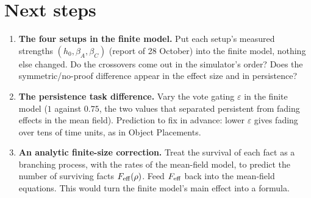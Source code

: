 \documentclass[10pt,a4paper]{article}
\begin{document}
\section{Next steps}
\begin{enumerate}
\item \textbf{The four setups in the finite model.} Put each setup's measured strengths $(h_0,\beta_A,\beta_C)$ (report
  of 28 October) into the finite model, nothing else changed. Do the crossovers come out in the simulator's order? Does
  the symmetric/no-proof difference appear in the effect size and in persistence?
\item \textbf{The persistence task difference.} Vary the vote gating $\varepsilon$ in the finite model ($1$ against
  $0.75$, the two values that separated persistent from fading effects in the mean field). Prediction to fix in advance:
  lower $\varepsilon$ gives fading over tens of time units, as in Object Placements.
\item \textbf{An analytic finite-size correction.} Treat the survival of each fact as a branching process, with the
  rates of the mean-field model, to predict the number of surviving facts $F_{\rm eff}(\rho)$. Feed $F_{\rm eff}$ back
  into the mean-field equations. This would turn the finite model's main effect into a formula.
\end{enumerate}
\end{document}
